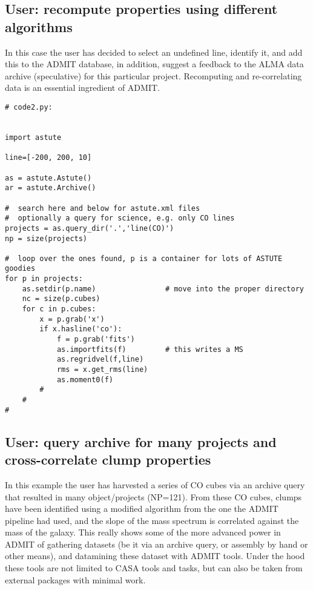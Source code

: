 \documentclass[preprint]{aastex} %
\begin{document}
\subsection{User: recompute properties using different algorithms}

In this case the user has decided to select an undefined line, identify it, 
and add this to the ADMIT database, in addition, suggest a feedback to the ALMA data archive
(speculative) for this particular project.
Recomputing and re-correlating data is an essential ingredient of ADMIT.

\footnotesize
\begin{verbatim}
# code2.py:


import astute

line=[-200, 200, 10]

as = astute.Astute()
ar = astute.Archive()

#  search here and below for astute.xml files
#  optionally a query for science, e.g. only CO lines
projects = as.query_dir('.','line(CO)')
np = size(projects)

#  loop over the ones found, p is a container for lots of ASTUTE goodies
for p in projects:
    as.setdir(p.name)                # move into the proper directory
    nc = size(p.cubes)
    for c in p.cubes:
        x = p.grab('x')
        if x.hasline('co'):
            f = p.grab('fits')
            as.importfits(f)         # this writes a MS
            as.regridvel(f,line)
            rms = x.get_rms(line)
            as.moment0(f)
        #
    #
#

\end{verbatim}
\normalsize


\subsection{User: query archive for many projects and cross-correlate clump properties}

In this example the user has harvested a series of CO cubes via
an archive query that resulted in many object/projects (NP=121).
From these CO cubes, clumps have been identified using a modified
algorithm from the one the ADMIT pipeline had used, and the slope
of the mass spectrum is correlated against the mass of the galaxy.
This really shows some of the more advanced power in ADMIT
of gathering datasets (be it via an archive query, or assembly by
hand or other means), and datamining these dataset with ADMIT tools.
Under the hood these tools are not limited to CASA tools and tasks, but
can also be taken from external packages with minimal work.
\end{document}
